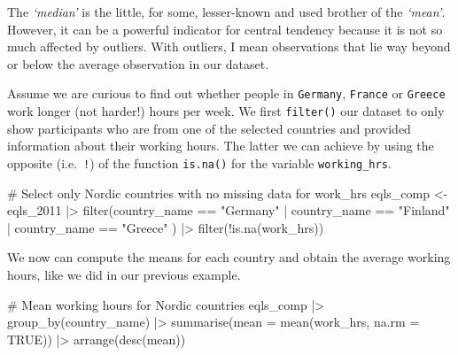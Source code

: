 \documentclass[
  letterpaper,
]{krantz}
\makeatletter
\newenvironment{Shaded}{\begin{snugshade}}{\end{snugshade}}
\newcommand{\AttributeTok}[1]{\textcolor[rgb]{0.40,0.45,0.13}{#1}}
\newcommand{\CommentTok}[1]{\textcolor[rgb]{0.37,0.37,0.37}{#1}}
\newcommand{\ConstantTok}[1]{\textcolor[rgb]{0.56,0.35,0.01}{#1}}
\newcommand{\FunctionTok}[1]{\textcolor[rgb]{0.28,0.35,0.67}{#1}}
\newcommand{\NormalTok}[1]{\textcolor[rgb]{0.00,0.23,0.31}{#1}}
\newcommand{\OtherTok}[1]{\textcolor[rgb]{0.00,0.23,0.31}{#1}}
\newcommand{\SpecialCharTok}[1]{\textcolor[rgb]{0.37,0.37,0.37}{#1}}
\newcommand{\StringTok}[1]{\textcolor[rgb]{0.13,0.47,0.30}{#1}}
\newenvironment{kframe}{%
\medskip{}
\setlength{\fboxsep}{.8em}
 \def\at@end@of@kframe{}%
 \ifinner\ifhmode%
  \def\at@end@of@kframe{\end{minipage}}%
  \begin{minipage}{\columnwidth}%
 \fi\fi%
 \def\FrameCommand##1{\hskip\@totalleftmargin \hskip-\fboxsep
 \colorbox{shadecolor}{##1}\hskip-\fboxsep
     \hskip-\linewidth \hskip-\@totalleftmargin \hskip\columnwidth}%
 \MakeFramed {\advance\hsize-\width
   \@totalleftmargin\z@ \linewidth\hsize
   \@setminipage}}%
 {\par\unskip\endMakeFramed%
 \at@end@of@kframe}
\renewenvironment{Shaded}{\begin{kframe}}{\end{kframe}}
\makeatother
\begin{document}
The \emph{`median'} is the little, for some, lesser-known and used
brother of the \emph{`mean'}. However, it can be a powerful indicator
for central tendency because it is not so much affected by outliers.
With outliers, I mean observations that lie way beyond or below the
average observation in our dataset.

Assume we are curious to find out whether people in \texttt{Germany},
\texttt{France} or \texttt{Greece} work longer (not harder!) hours per
week. We first \texttt{filter()} our dataset to only show participants
who are from one of the selected countries and provided information
about their working hours. The latter we can achieve by using the
opposite (i.e.~\texttt{!}) of the function \texttt{is.na()} for the
variable \texttt{working\_hrs}.

\begin{Shaded}
\begin{Highlighting}[]
\CommentTok{\# Select only Nordic countries with no missing data for \textquotesingle{}work\_hrs\textquotesingle{}}
\NormalTok{eqls\_comp }\OtherTok{\textless{}{-}} 
\NormalTok{  eqls\_2011 }\SpecialCharTok{|\textgreater{}}
  \FunctionTok{filter}\NormalTok{(country\_name }\SpecialCharTok{==} \StringTok{"Germany"} \SpecialCharTok{|}
\NormalTok{         country\_name }\SpecialCharTok{==} \StringTok{"Finland"} \SpecialCharTok{|}
\NormalTok{         country\_name }\SpecialCharTok{==} \StringTok{"Greece"}
\NormalTok{          ) }\SpecialCharTok{|\textgreater{}}
  \FunctionTok{filter}\NormalTok{(}\SpecialCharTok{!}\FunctionTok{is.na}\NormalTok{(work\_hrs))}
\end{Highlighting}
\end{Shaded}

We now can compute the means for each country and obtain the average
working hours, like we did in our previous example.

\begin{Shaded}
\begin{Highlighting}[]
\CommentTok{\# Mean working hours for Nordic countries}
\NormalTok{eqls\_comp }\SpecialCharTok{|\textgreater{}}
  \FunctionTok{group\_by}\NormalTok{(country\_name) }\SpecialCharTok{|\textgreater{}}
  \FunctionTok{summarise}\NormalTok{(}\AttributeTok{mean =} \FunctionTok{mean}\NormalTok{(work\_hrs, }\AttributeTok{na.rm =} \ConstantTok{TRUE}\NormalTok{)) }\SpecialCharTok{|\textgreater{}}
  \FunctionTok{arrange}\NormalTok{(}\FunctionTok{desc}\NormalTok{(mean))}
\end{Highlighting}
\end{Shaded}
\end{document}
